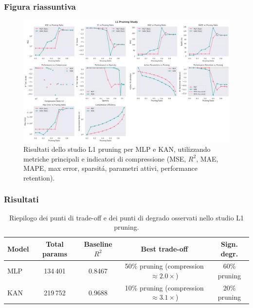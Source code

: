 \documentclass[a4paper,12pt]{report}
\begin{document}
	\subsubsection{Figura riassuntiva}
	\begin{figure}[H]
		\centering
		\includegraphics[width=1.0\textwidth]{img/abl_kanvsmlp_car.png}
		\caption{Risultati dello studio L1 pruning per MLP e KAN, utilizzando metriche principali e indicatori di compressione (MSE, \(R^2\), MAE, MAPE, max error, sparsitá, parametri attivi, performance retention).}
	\end{figure}
	
	\subsubsection{Risultati}
	\begin{table}[H]
		\centering
		\setlength{\tabcolsep}{2pt}
		\begin{tabular}{lcccc}
			\toprule
			\textbf{Model} & \textbf{Total params} & \textbf{Baseline $R^2$} & \textbf{Best trade-off} & \textbf{Sign. degr.} \\
			\midrule
			MLP & 134\,401  & 0.8467 & 50\% pruning (compression $\approx 2.0\times$) & 60\% pruning \\
			KAN & 219\,752  & 0.9688 & 10\% pruning (compression $\approx 3.1\times$) & 20\% pruning \\
			\bottomrule
		\end{tabular}
		\caption{Riepilogo dei punti di trade-off e dei punti di degrado osservati nello studio L1 pruning.}
	\end{table}
	
\end{document}
